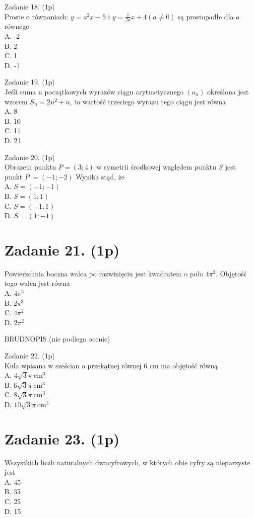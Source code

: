 \documentclass[10pt]{article}
\begin{document}
Zadanie 18. (1p)\\
Proste o równaniach: \(y=a^{2} x-5\) i \(y=\frac{1}{2 a} x+4(a \neq 0)\) są prostopadłe dla \(a\) równego\\
A. -2\\
B. 2\\
C. 1\\
D. -1

Zadanie 19. (1p)\\
Jeśli suma n początkowych wyrazów ciągu arytmetycznego \(\left(a_{n}\right)\) określona jest wzorem \(S_{n}=2 n^{2}+n\), to wartość trzeciego wyrazu tego ciągu jest równa\\
A. 8\\
B. 10\\
C. 11\\
D. 21

Zadanie 20. (1p)\\
Obrazem punktu \(P=(3 ; 4)\) w symetrii środkowej względem punktu \(S\) jest punkt \(P^{\prime}=(-1 ;-2)\) Wynika stąd, że\\
A. \(S=(-1 ;-1)\)\\
B. \(S=(1 ; 1)\)\\
C. \(S=(-1 ; 1)\)\\
D. \(S=(1 ;-1)\)

\section*{Zadanie 21. (1p)}
Powierzchnia boczna walca po rozwinięciu jest kwadratem o polu \(4 \pi^{2}\). Objętość tego walca jest równa\\
A. \(4 \pi^{3}\)\\
B. \(2 \pi^{3}\)\\
C. \(4 \pi^{2}\)\\
D. \(2 \pi^{2}\)

BRUDNOPIS (nie podlega ocenie)

Zadanie 22. (1p)\\
Kula wpisana w sześcian o przekątnej równej 6 cm ma objętość równą\\
A. \(4 \sqrt{3} \pi \mathrm{~cm}^{3}\)\\
B. \(6 \sqrt{3} \pi \mathrm{~cm}^{3}\)\\
C. \(8 \sqrt{3} \pi \mathrm{~cm}^{3}\)\\
D. \(10 \sqrt{3} \pi \mathrm{~cm}^{3}\)

\section*{Zadanie 23. (1p)}
Wszystkich liczb naturalnych dwucyfrowych, w których obie cyfry są nieparzyste jest\\
A. 45\\
B. 35\\
C. 25\\
D. 15
\end{document}
